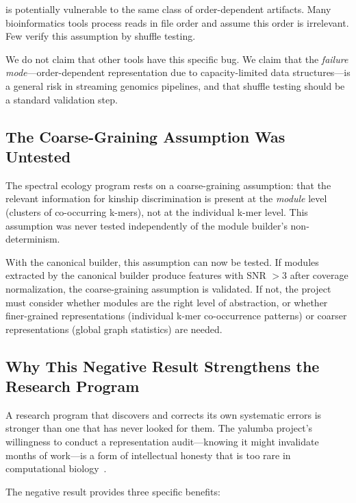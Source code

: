 \documentclass{../yalumba}
\begin{document}
is potentially vulnerable to the same class of order-dependent artifacts.
Many bioinformatics tools process reads in file order and assume this order
is irrelevant. Few verify this assumption by shuffle testing.

\begin{limitation}[Generalizability]
We do not claim that other tools have this specific bug. We claim that the
\textit{failure mode}---order-dependent representation due to capacity-limited
data structures---is a general risk in streaming genomics pipelines, and that
shuffle testing should be a standard validation step.
\end{limitation}

\subsection{The Coarse-Graining Assumption Was Untested}

The spectral ecology program rests on a coarse-graining assumption: that the
relevant information for kinship discrimination is present at the \textit{module}
level (clusters of co-occurring k-mers), not at the individual k-mer level.
This assumption was never tested independently of the module builder's
non-determinism.

With the canonical builder, this assumption can now be tested. If modules
extracted by the canonical builder produce features with SNR $> 3$ after
coverage normalization, the coarse-graining assumption is validated. If not,
the project must consider whether modules are the right level of abstraction,
or whether finer-grained representations (individual k-mer co-occurrence
patterns) or coarser representations (global graph statistics) are needed.

\subsection{Why This Negative Result Strengthens the Research Program}

A research program that discovers and corrects its own systematic errors is
stronger than one that has never looked for them. The yalumba project's
willingness to conduct a representation audit---knowing it might invalidate
months of work---is a form of intellectual honesty that is too rare in
computational biology~\cite{baker2016reproducibility, ioannidis2005most}.

The negative result provides three specific benefits:
\end{document}

